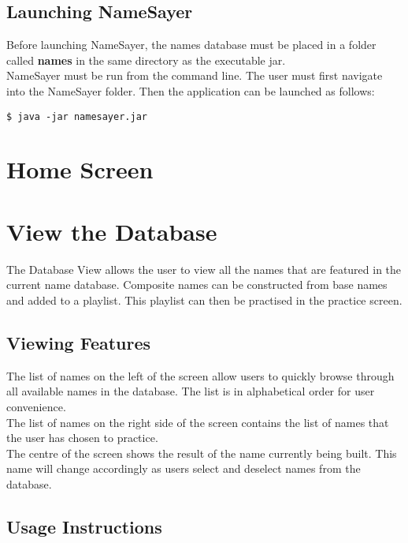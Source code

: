 \documentclass{article}
\begin{document}
\subsection{Launching NameSayer}
Before launching NameSayer, the names database must be placed in a folder called
\textbf{names} in the same directory as  the executable jar. \\

NameSayer must be run from the command line. The user must first navigate into
the NameSayer folder. Then the application can be launched as follows:

\begin{verbatim}
$ java -jar namesayer.jar
\end{verbatim}

\section{Home Screen}

\section{View the Database}
The Database View allows the user to view all the names that are  featured in
the current name database. Composite names can be constructed from base names
and added to a playlist. This playlist can then be practised in the practice
screen.

\subsection{Viewing Features}
The list of names on the left of the screen allow users to quickly browse
through all available names in the database. The list is in alphabetical order
for user convenience. \\

The list of names on the right side of the screen contains the list of names
that the user has chosen to practice. \\

The centre of the screen shows the result of the name currently being built.
This name will change accordingly as users select and  deselect names from the
database.

\subsection{Usage Instructions}
\end{document}
